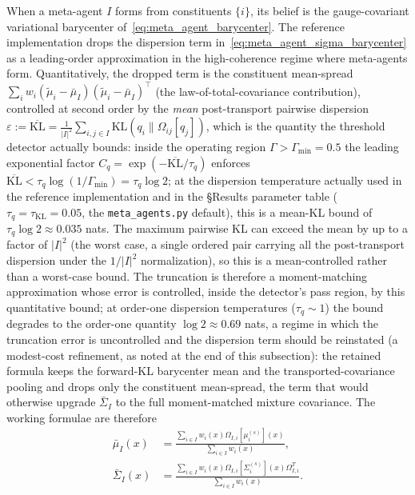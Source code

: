 \documentclass[11pt]{article}
\begin{document}
When a meta-agent $I$ forms from constituents $\{i\}$, its belief is the gauge-covariant variational barycenter of~\eqref{eq:meta_agent_barycenter}. The reference implementation drops the dispersion term in~\eqref{eq:meta_agent_sigma_barycenter} as a leading-order approximation in the high-coherence regime where meta-agents form. Quantitatively, the dropped term is the constituent mean-spread $\sum_i w_i (\tilde{\mu}_i - \bar{\mu}_I)(\tilde{\mu}_i - \bar{\mu}_I)^\top$ (the law-of-total-covariance contribution), controlled at second order by the \emph{mean} post-transport pairwise dispersion $\varepsilon := \overline{\mathrm{KL}} = \frac{1}{|I|^2}\sum_{i,j \in I} \mathrm{KL}(q_i \| \Omega_{ij}[q_j])$, which is the quantity the threshold detector actually bounds: inside the operating region $\Gamma > \Gamma_{\min} = 0.5$ the leading exponential factor $C_q = \exp(-\overline{\mathrm{KL}}/\tau_q)$ enforces $\overline{\mathrm{KL}} < \tau_q \log(1/\Gamma_{\min}) = \tau_q \log 2$; at the dispersion temperature actually used in the reference implementation and in the §Results parameter table ($\tau_q = \tau_{\mathrm{KL}} = 0.05$, the \texttt{meta\_agents.py} default), this is a mean-KL bound of $\tau_q \log 2 \approx 0.035$ nats. The maximum pairwise KL can exceed the mean by up to a factor of $|I|^2$ (the worst case, a single ordered pair carrying all the post-transport dispersion under the $1/|I|^2$ normalization), so this is a mean-controlled rather than a worst-case bound. The truncation is therefore a moment-matching approximation whose error is controlled, inside the detector's pass region, by this quantitative bound; at order-one dispersion temperatures ($\tau_q \sim 1$) the bound degrades to the order-one quantity $\log 2 \approx 0.69$ nats, a regime in which the truncation error is uncontrolled and the dispersion term should be reinstated (a modest-cost refinement, as noted at the end of this subsection): the retained formula keeps the forward-KL barycenter mean and the transported-covariance pooling and drops only the constituent mean-spread, the term that would otherwise upgrade $\bar{\Sigma}_I$ to the full moment-matched mixture covariance. The working formulae are therefore
\begin{align}
\bar{\mu}_I(x) &= \frac{\sum_{i \in I} w_i(x)  \Omega_{I,i}[\mu_i^{(s)}](x)}{\sum_{i \in I} w_i(x)},
\label{eq:meta_agent_mu_impl}
\\
\bar{\Sigma}_I(x) &= \frac{\sum_{i \in I} w_i(x)  \Omega_{I,i}[\Sigma_i^{(s)}](x)  \Omega_{I,i}^T}{\sum_{i \in I} w_i(x)}.
\label{eq:meta_agent_sigma_impl}
\end{align}
\end{document}
